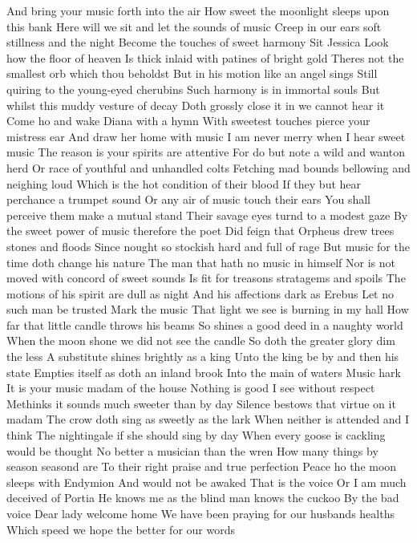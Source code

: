 And bring your music forth into the air
How sweet the moonlight sleeps upon this bank
Here will we sit and let the sounds of music
Creep in our ears soft stillness and the night
Become the touches of sweet harmony
Sit Jessica Look how the floor of heaven
Is thick inlaid with patines of bright gold
Theres not the smallest orb which thou beholdst
But in his motion like an angel sings
Still quiring to the young-eyed cherubins
Such harmony is in immortal souls
But whilst this muddy vesture of decay
Doth grossly close it in we cannot hear it
Come ho and wake Diana with a hymn
With sweetest touches pierce your mistress ear
And draw her home with music
I am never merry when I hear sweet music
The reason is your spirits are attentive
For do but note a wild and wanton herd
Or race of youthful and unhandled colts
Fetching mad bounds bellowing and neighing loud
Which is the hot condition of their blood
If they but hear perchance a trumpet sound
Or any air of music touch their ears
You shall perceive them make a mutual stand
Their savage eyes turnd to a modest gaze
By the sweet power of music therefore the poet
Did feign that Orpheus drew trees stones and floods
Since nought so stockish hard and full of rage
But music for the time doth change his nature
The man that hath no music in himself
Nor is not moved with concord of sweet sounds
Is fit for treasons stratagems and spoils
The motions of his spirit are dull as night
And his affections dark as Erebus
Let no such man be trusted Mark the music
That light we see is burning in my hall
How far that little candle throws his beams
So shines a good deed in a naughty world
When the moon shone we did not see the candle
So doth the greater glory dim the less
A substitute shines brightly as a king
Unto the king be by and then his state
Empties itself as doth an inland brook
Into the main of waters Music hark
It is your music madam of the house
Nothing is good I see without respect
Methinks it sounds much sweeter than by day
Silence bestows that virtue on it madam
The crow doth sing as sweetly as the lark
When neither is attended and I think
The nightingale if she should sing by day
When every goose is cackling would be thought
No better a musician than the wren
How many things by season seasond are
To their right praise and true perfection
Peace ho the moon sleeps with Endymion
And would not be awaked
That is the voice
Or I am much deceived of Portia
He knows me as the blind man knows the cuckoo
By the bad voice
Dear lady welcome home
We have been praying for our husbands healths
Which speed we hope the better for our words
